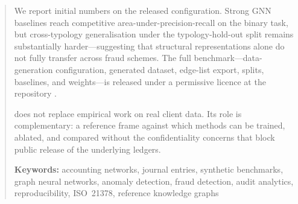 \begin{abstract}
We report initial numbers on the released configuration.  Strong GNN
baselines reach competitive area-under-precision-recall on the binary
task, but cross-typology generalisation under the typology-hold-out
split remains substantially harder---suggesting that structural
representations alone do not fully transfer across fraud schemes.
The full benchmark---data-generation configuration, generated dataset,
edge-list export, splits, baselines, and weights---is released under a
permissive licence at the \system{} repository
\citep{datasynth-repo}.

\bench{} does not replace empirical work on real client data.  Its role
is complementary: a reference frame against which methods can be
trained, ablated, and compared without the confidentiality concerns
that block public release of the underlying ledgers.

\medskip
\noindent\textbf{Keywords:} accounting networks, journal entries,
synthetic benchmarks, graph neural networks, anomaly detection, fraud
detection, audit analytics, reproducibility, ISO~21378, reference
knowledge graphs
\end{abstract}
